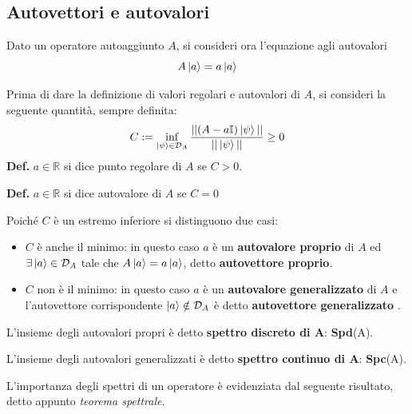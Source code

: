 \subsection{Autovettori e autovalori}

Dato un operatore autoaggiunto $ A $, si consideri ora l'equazione agli autovalori
$$ A\ket{a} = a\ket{a} $$ 

Prima di dare la definizione di valori regolari e autovalori di $ A $, si consideri la seguente
quantità, sempre definita:
$$ C := \inf\limits_{\ket{\psi}\in\mathcal{D}_A}\frac{||(A-a\mathbb{I})\ket{\psi}||}{||\ket{\psi}||}\geq 0$$ 
\textbf{Def.} $a\in\mathbb{R}$ si dice punto regolare di $ A $ se $ C > 0 $.

\textbf{Def.} $a\in\mathbb{R}$ si dice autovalore di $ A $ se $C=0$

Poiché $ C $ è un estremo inferiore si distinguono due casi:
\begin{itemize}
    \item $ C $ è anche il minimo: in questo caso $ a $ è un \textbf{autovalore proprio} di $ A $
	ed $ \exists \ket{a}\in\mathcal{D}_A $ tale che $ A\ket{a} = a\ket{a}$, detto
	\textbf{autovettore proprio}.
    \item $ C $ non è il minimo: in questo caso $ a $ è un \textbf{autovalore generalizzato} di 
	$ A $ e l'autovettore corrispondente $ \ket{a}\notin\mathcal{D}_A $ è detto
	\textbf{autovettore generalizzato} . 
\end{itemize}

L'insieme degli	autovalori propri è detto \textbf{spettro discreto di A}: \textbf{Spd}(A).

L'insieme degli autovalori generalizzati è detto \textbf{spettro continuo di A}: \textbf{Spc}(A).

L'importanza degli spettri di un operatore è evidenziata dal seguente risultato, detto appunto
\textit{teorema spettrale}.

